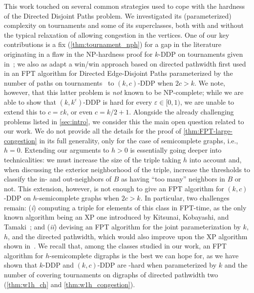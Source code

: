 \documentclass[a4paper,UKenglish,cleveref, autoref, thm-restate]{lipics-v2021}
\renewcommand{\NP}{{\sf NP}\xspace}
\renewcommand{\FPT}{{\sf FPT}\xspace}
\renewcommand{\XP}{{\sf XP}\xspace}
\newcommand{\pname}[1]{{\sc #1}}
\begin{document}
This work touched on several common strategies used to cope with the hardness of the \pname{Directed Disjoint Paths} problem.
We investigated its (parameterized) complexity on tournaments and some of its superclasses, both with and without the typical relaxation of allowing congestion in the vertices.
One of our key contributions is a fix (\autoref{thm:tournament_nph}) for a gap in the literature originating in a flaw in the \NP-hardness proof for \pname{$k$-DDP} on tournaments given in~\cite{thomassen_tournament_nph}; we also as adapt a win/win approach based on directed pathwidth first used in an \FPT algorithm for \pname{Directed Edge-Disjoint Paths} parameterized by the number of paths on tournaments~\cite{FominP19} to \pname{$(k,c)$-DDP} when $2c > k$.
We note, however, that this latter problem is \textit{not} known to be \NP-complete; while we are able to show that \pname{$(k,k^\varepsilon)$-DDP} is hard for every $\varepsilon \in [0,1)$, we are unable to extend this to $c = \varepsilon k$, or even $c = k/2 + 1$. Alongside the already challenging problems listed in \autoref{sec:intro}, we consider this the main open question related to our work.
We do not provide all the details for the proof of \autoref{thm:FPT-large-congestion} in its full generality, only for the case of semicomplete graphs, i.e., $h=0$. Extending our arguments to $h > 0$ is essentially going deeper into technicalities: we must increase the size of the triple taking $h$ into account and, when discussing the exterior neighborhood of the triple, increase the thresholds to classify the in- and out-neighbors of $B$ as having ``too many'' neighbors in $B$ or not.
This extension, however, is not enough to give an \FPT algorithm for \pname{$(k,c)$-DDP} on $h$-semicomplete graphs when $2c > k$.
In particular, two challenges remain: (\textit{i}) computing a triple for elements of this class in \FPT-time, as the only known algorithm being an \XP one introduced by Kitsunai, Kobayashi, and Tamaki~\cite{KitsunaiKT15}; and (\textit{ii}) devising an \FPT algorithm for the joint parameterization by $k$, $h$, and the directed pathwidth, which would also improve upon the \XP algorithm shown in~\cite{KitsunaiKT15}.
We recall that, among the classes studied in our work, an \FPT algorithm for $h$-semicomplete digraphs is the best we can hope for, as we have shown that \pname{$k$-DDP} and \pname{$(k,c)$-DDP} are \W[1]-hard when parameterized by $k$ and the number of covering tournaments on digraphs of directed pathwidth two (\autoref{thm:w1h_ch} and \autoref{thm:w1h_congestion}). 

\end{document}
